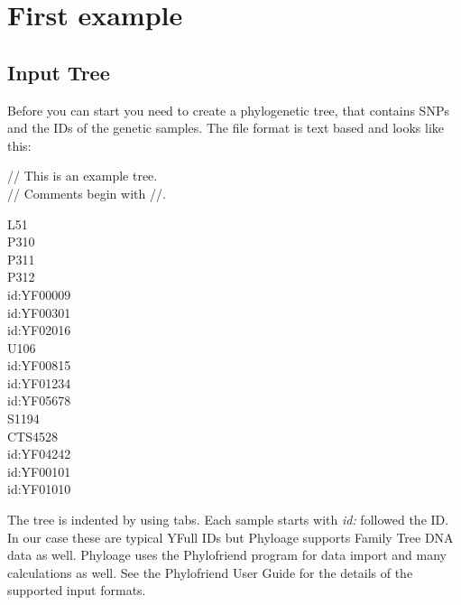 \section{First example}

\subsection{Input Tree}

Before you can start you need to create a phylogenetic tree,
that contains SNPs and the IDs of the genetic samples. The
file format is text based and looks like this:

\vspace{1em}
\noindent
// This is an example tree.\\
// Comments begin with //.
\vspace{1em}

\noindent L51\\
\hspace*{4ex}P310\\
\hspace*{8ex}P311\\
\hspace*{12ex}P312\\
\hspace*{16ex}id:YF00009\\
\hspace*{16ex}id:YF00301\\
\hspace*{16ex}id:YF02016\\
\hspace*{12ex}U106\\
\hspace*{16ex}id:YF00815\\
\hspace*{16ex}id:YF01234\\
\hspace*{16ex}id:YF05678\\
\hspace*{12ex}S1194\\
\hspace*{16ex}CTS4528\\
\hspace*{20ex}id:YF04242\\
\hspace*{20ex}id:YF00101\\
\hspace*{20ex}id:YF01010
\vspace{1em}

The tree is indented by using tabs. Each sample starts with
\emph{id:} followed the ID. In our case these are typical
YFull IDs but Phyloage supports Family Tree DNA data as well.
Phyloage uses the Phylofriend \cite{Phylofriend} program for
data import and many calculations as well. See the Phylofriend
User Guide \cite{PhylofriendUserGuide} for the details of
the supported input formats.

